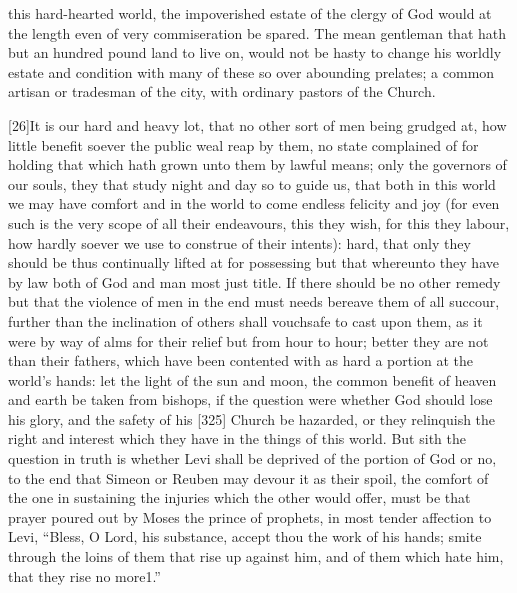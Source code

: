 this hard-hearted world, the impoverished estate of the clergy of God would at the length even of very commiseration be spared. The mean gentleman that hath but an hundred pound land to live on, would not be hasty to change his worldly estate and condition with many of these so over abounding prelates; a common artisan or tradesman of the city, with ordinary pastors of the Church.

[26]It is our hard and heavy lot, that no other sort of men being grudged at, how little benefit soever the public weal reap by them, no state complained of for holding that which hath grown unto them by lawful means; only the governors of our souls, they that study night and day so to guide us, that both in this world we may have comfort and in the world to come endless felicity and joy (for even such is the very scope of all their endeavours, this they wish, for this they labour, how hardly soever we use to construe of their intents): hard, that only they should be thus continually lifted at for possessing but that whereunto they have by law both of God and man most just title. If there should be no other remedy but that the violence of men in the end must needs bereave them of all succour, further than the inclination of others shall vouchsafe to cast upon them, as it were by way of alms for their relief but from hour to hour; better they are not than their fathers, which have been contented with as hard a portion at the world’s hands: let the light of the sun and moon, the common benefit of heaven and earth be taken from bishops, if the question were whether God should lose his glory, and the safety of his [325] Church be hazarded, or they relinquish the right and interest which they have in the things of this world. But sith the question in truth is whether Levi shall be deprived of the portion of God or no, to the end that Simeon or Reuben may devour it as their spoil, the comfort of the one in sustaining the injuries which the other would offer, must be that prayer poured out by Moses the prince of prophets, in most tender affection to Levi, “Bless, O Lord, his substance, accept thou the work of his hands; smite through the loins of them that rise up against him, and of them which hate him, that they rise no more1.”

